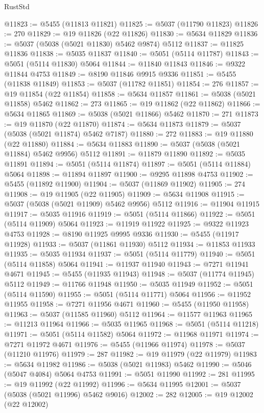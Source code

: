 \begin{lexlean}{RustStd}
\begin{coremodule}
@11823 := @5455 (@11813 @11821)
@11825 := @5037 (@11790 @11823)
@11826 := 270
@11829 := @19 @11826 (@22 @11826)
@11830 := @5634 @11829
@11836 := @5037 (@5038 (@5021 @11830) @5462 @9874) @5112
@11837 := @11825 @11836
@11838 := @5035 @11837
@11840 := @5051 (@5114 @11787)
@11843 := @5051 (@5114 @11830) @5064
@11844 := @11840 @11843
@11846 := @9322 @11844 @4753
@11849 := @8190 @11846 @9915 @9336
@11851 := @5455 (@11838 @11849)
@11853 := @5037 (@11782 @11851)
@11854 := 276
@11857 := @19 @11854 (@22 @11854)
@11858 := @5634 @11857
@11861 := @5038 (@5021 @11858) @5462
@11862 := 273
@11865 := @19 @11862 (@22 @11862)
@11866 := @5634 @11865
@11869 := @5038 (@5021 @11866) @5462
@11870 := 271
@11873 := @19 @11870 (@22 @11870)
@11874 := @5634 @11873
@11879 := @5037 (@5038 (@5021 @11874) @5462 @7187)
@11880 := 272
@11883 := @19 @11880 (@22 @11880)
@11884 := @5634 @11883
@11890 := @5037 (@5038 (@5021 @11884) @5462 @9956) @5112
@11891 := @11879 @11890
@11892 := @5035 @11891
@11894 := @5051 (@5114 @11874)
@11897 := @5051 (@5114 @11884) @5064
@11898 := @11894 @11897
@11900 := @9295 @11898 @4753
@11902 := @5455 (@11892 @11900)
@11904 := @5037 (@11869 @11902)
@11905 := 274
@11908 := @19 @11905 (@22 @11905)
@11909 := @5634 @11908
@11915 := @5037 (@5038 (@5021 @11909) @5462 @9956) @5112
@11916 := @11904 @11915
@11917 := @5035 @11916
@11919 := @5051 (@5114 @11866)
@11922 := @5051 (@5114 @11909) @5064
@11923 := @11919 @11922
@11925 := @9322 @11923 @4753
@11928 := @8190 @11925 @9995 @9336
@11930 := @5455 (@11917 @11928)
@11933 := @5037 (@11861 @11930) @5112
@11934 := @11853 @11933
@11935 := @5035 @11934
@11937 := @5051 (@5114 @11779)
@11940 := @5051 (@5114 @11858) @5064
@11941 := @11937 @11940
@11943 := @7271 @11941 @4671
@11945 := @5455 (@11935 @11943)
@11948 := @5037 (@11774 @11945) @5112
@11949 := @11766 @11948
@11950 := @5035 @11949
@11952 := @5051 (@5114 @11590)
@11955 := @5051 (@5114 @11771) @5064
@11956 := @11952 @11955
@11958 := @7271 @11956 @4671
@11960 := @5455 (@11950 @11958)
@11963 := @5037 (@11585 @11960) @5112
@11964 := @11577 @11963
@11965 := @11213 @11964
@11966 := @5035 @11965
@11968 := @5051 (@5114 @11218)
@11971 := @5051 (@5114 @11582) @5064
@11972 := @11968 @11971
@11974 := @7271 @11972 @4671
@11976 := @5455 (@11966 @11974)
@11978 := @5037 (@11210 @11976)
@11979 := 287
@11982 := @19 @11979 (@22 @11979)
@11983 := @5634 @11982
@11986 := @5038 (@5021 @11983) @5462
@11990 := @5046 (@5047 @4084) @5064 @4753
@11991 := @5051 @11990
@11992 := 281
@11995 := @19 @11992 (@22 @11992)
@11996 := @5634 @11995
@12001 := @5037 (@5038 (@5021 @11996) @5462 @9016)
@12002 := 282
@12005 := @19 @12002 (@22 @12002)

\end{coremodule}
\end{lexlean}
